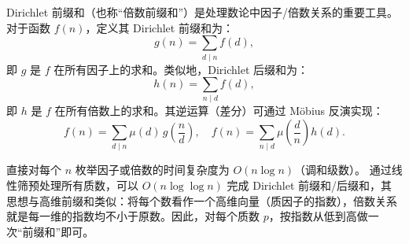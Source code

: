 Dirichlet 前缀和（也称“倍数前缀和”）是处理数论中因子/倍数关系的重要工具。对于函数 $f(n)$，定义其 Dirichlet 前缀和为：
\[
g(n) = \sum_{d\mid n} f(d),
\]
即 $g$ 是 $f$ 在所有因子上的求和。类似地，Dirichlet 后缀和为：
\[
h(n) = \sum_{n\mid d} f(d),
\]
即 $h$ 是 $f$ 在所有倍数上的求和。其逆运算（差分）可通过 Möbius 反演实现：
\[
f(n) = \sum_{d\mid n} \mu(d) \, g\!\left(\frac{n}{d}\right), \quad
f(n) = \sum_{n\mid d} \mu\!\left(\frac{d}{n}\right) h(d).
\]

直接对每个 $n$ 枚举因子或倍数的时间复杂度为 $O(n \log n)$（调和级数）。  
通过线性筛预处理所有质数，可以 $O(n \log \log n)$ 完成 Dirichlet 前缀和/后缀和，其思想与高维前缀和类似：将每个数看作一个高维向量（质因子的指数），倍数关系就是每一维的指数均不小于原数。因此，对每个质数 $p$，按指数从低到高做一次“前缀和”即可。